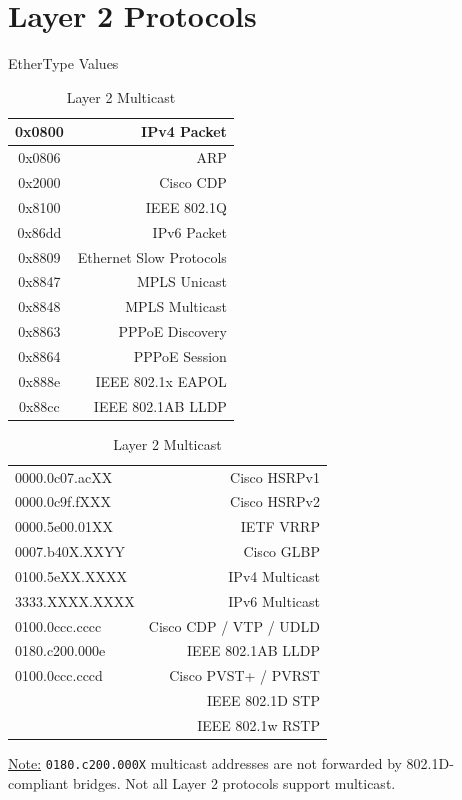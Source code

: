 \documentclass[12pt]{article}
\newif\ifcolor											%
\newcommand{\note}[1]{\ifcolor \colorbox{#1}{Note:}\else \underline{Note:}\fi}
\newcommand{\mr}[2]{\multirow{#1}{*}{#2}}
\begin{document}
\section{Layer 2 Protocols \label{sec:L2}}
	\begin{table}[H]
	\begin{minipage}[t]{.4\linewidth}
	\centering
	\caption{EtherType Values \label{tab:ETHERTYPE}}
	\begin{tabular}{| >{\ttfamily}c | r |}\hline
	0x0800	& IPv4 Packet\\\hline
	0x0806	& ARP\\\hline
	0x2000	& Cisco CDP\\\hline
	0x8100	& IEEE 802.1Q\\\hline
	0x86dd	& IPv6 Packet\\\hline
	0x8809	& Ethernet Slow Protocols\\\hline
	0x8847	& MPLS Unicast\\
	0x8848	& MPLS Multicast\\\hline
	0x8863	& PPPoE Discovery\\
	0x8864	& PPPoE Session\\\hline
	0x888e	& IEEE 802.1x EAPOL\\\hline
	0x88cc	& IEEE 802.1AB LLDP\\\hline
	\end{tabular}\end{minipage}\hfill
	\begin{minipage}[t]{.6\linewidth}
	\centering
	\caption{Layer 2 Multicast \label{tab:MULTICAST L2}}
	\begin{tabular}{| >{\ttfamily}l | r |}\hline
	0000.0c07.acXX		& Cisco HSRPv1\\
	0000.0c9f.fXXX		& Cisco HSRPv2\\\hline
	0000.5e00.01XX 		& IETF VRRP\\\hline
	0007.b40X.XXYY		& Cisco GLBP\\\hline
	0100.5eXX.XXXX		& IPv4 Multicast\\
	3333.XXXX.XXXX		& IPv6 Multicast\\\hline
	0100.0ccc.cccc	 	& Cisco CDP / VTP / UDLD\\\hline
	0180.c200.000e	 	& IEEE 802.1AB LLDP\\\hline
	0100.0ccc.cccd		& Cisco PVST+ / PVRST\\\hline
	\mr{2}{0180.c200.0000}	& IEEE 802.1D STP\\
					& IEEE 802.1w RSTP\\\hline
	\end{tabular}\end{minipage}\end{table}
	\note{Goldenrod} \texttt{0180.c200.000X} multicast addresses are not forwarded by 802.1D-compliant bridges. Not all Layer 2 protocols support multicast.
\end{document}
